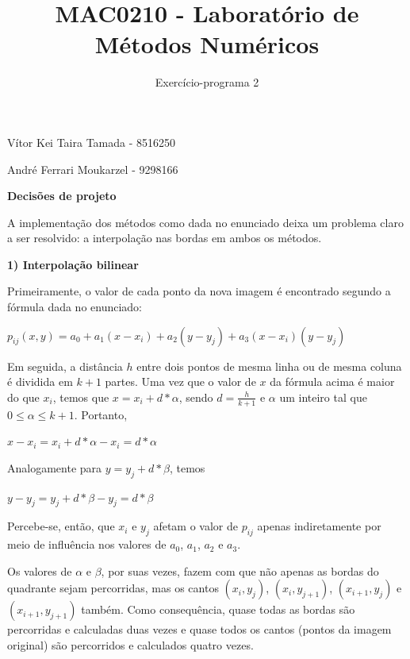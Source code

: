 \documentclass{article}
\title{MAC0210 - Laboratório de Métodos Numéricos}
\author{Exercício-programa 2}
\date{ }
\begin{document}
\maketitle

\begin{center}
\large{Vítor Kei Taira Tamada - 8516250}

\large{André Ferrari Moukarzel - 9298166}
\end{center}

\bigskip
\textbf{\Large{Decisões de projeto}}

\quad A implementação dos métodos como dada no enunciado deixa um problema claro a ser resolvido: a interpolação nas bordas em ambos os métodos.

\bigskip
\textbf{\large{1) Interpolação bilinear}}

\quad Primeiramente, o valor de cada ponto da nova imagem é encontrado segundo a fórmula dada no enunciado:

\begin{center}
$p_{ij}(x, y) = a_{0} + a_{1}(x - x_{i}) + a_{2}(y - y_{j}) + a_{3}(x - x_{i})(y - y_{j})$
\end{center}

\quad Em seguida, a distância $h$ entre dois pontos de mesma linha ou de mesma coluna é dividida em $k+1$ partes. Uma vez que o valor de $x$ da fórmula acima é maior do que $x_{i}$, temos que $x = x_{i} + d * \alpha$, sendo $d = \frac{h}{k+1}$ e $\alpha$ um inteiro tal que $0 \leq \alpha \leq k + 1$. Portanto,

\begin{center}
$x - x_{i} = x_{i} + d * \alpha - x_{i} = d * \alpha$
\end{center}

\quad Analogamente para $y = y_{j} + d * \beta$, temos

\begin{center}
$y - y_{j} = y_{j} + d * \beta - y_{j} = d * \beta$
\end{center}

\quad Percebe-se, então, que $x_{i}$ e $y_{j}$ afetam o valor de $p_{ij}$ apenas indiretamente por meio de influência nos valores de $a_{0}$, $a_{1}$, $a_{2}$ e $a_{3}$.

\quad Os valores de $\alpha$ e $\beta$, por suas vezes, fazem com que não apenas as bordas do quadrante sejam percorridas, mas os cantos $(x_{i}, y_{j})$, $(x_{i}, y_{j+1})$, $(x_{i+1}, y_{j})$ e $(x_{i+1}, y_{j+1})$ também. Como consequência, quase todas as bordas são percorridas e calculadas duas vezes e quase todos os cantos (pontos da imagem original) são percorridos e calculados quatro vezes.
\end{document}
